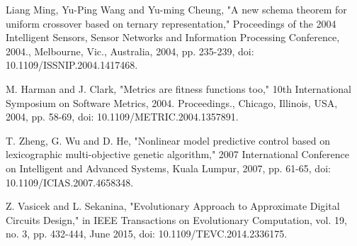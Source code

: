\documentclass[conference]{IEEEtran}
\begin{document}
\begin{thebibliography}{00}
 Liang Ming, Yu-Ping Wang and Yu-ming Cheung, "A new schema theorem for uniform crossover based on ternary representation," Proceedings of the 2004 Intelligent Sensors, Sensor Networks and Information Processing Conference, 2004., Melbourne, Vic., Australia, 2004, pp. 235-239, doi: 10.1109/ISSNIP.2004.1417468.

 M. Harman and J. Clark, "Metrics are fitness functions too," 10th International Symposium on Software Metrics, 2004. Proceedings., Chicago, Illinois, USA, 2004, pp. 58-69, doi: 10.1109/METRIC.2004.1357891.

 T. Zheng, G. Wu and D. He, "Nonlinear model predictive control based on lexicographic multi-objective genetic algorithm," 2007 International Conference on Intelligent and Advanced Systems, Kuala Lumpur, 2007, pp. 61-65, doi: 10.1109/ICIAS.2007.4658348.

Z. Vasicek and L. Sekanina, "Evolutionary Approach to Approximate Digital Circuits Design," in IEEE Transactions on Evolutionary Computation, vol. 19, no. 3, pp. 432-444, June 2015, doi: 10.1109/TEVC.2014.2336175.
\end{thebibliography}
\end{document}
